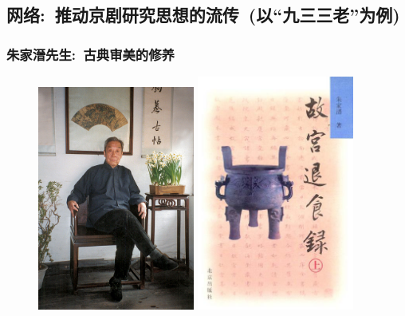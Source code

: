 \documentclass[cjk,slidestop,compress,mathserif,blue]{beamer}
\begin{document}
\subsection{网络:~推动京剧研究思想的流传~(以“九三三老”为例)}
\frame
{
	\frametitle{朱家溍先生:~古典审美的修养}
\begin{figure}[h!]
\centering
\vspace{-0.1in}
\includegraphics[height=0.64\textwidth,width=0.46\textwidth,viewport=0 0 500 720,clip]{Figures_Peking-Opera/Zhu_Jiajin.jpg}
\hskip 5pt
\includegraphics[height=0.64\textwidth,width=0.46\textwidth,viewport=0 0 450 610,clip]{Figures_Peking-Opera/Zhu_Tuishilu.jpg}
\label{Zhu_Jiajin}
\end{figure}
}
\end{document}

